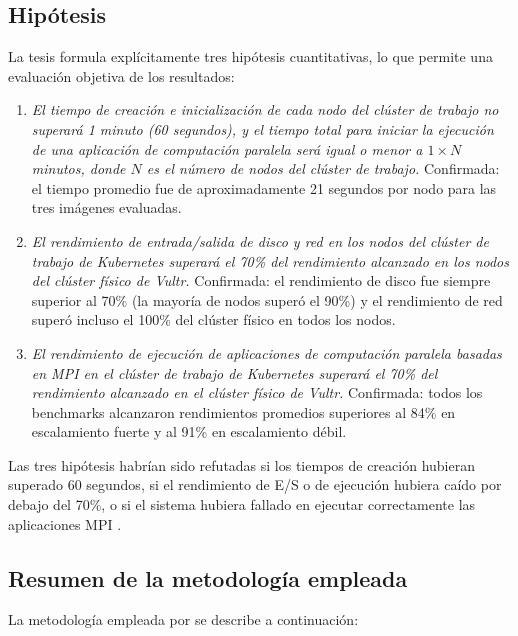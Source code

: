 \subsection{Hipótesis}

La tesis formula explícitamente tres hipótesis cuantitativas, lo que permite una evaluación objetiva de los resultados:

\begin{enumerate}
    \item \textit{El tiempo de creación e inicialización de cada nodo del clúster de trabajo no superará 1 minuto (60 segundos), y el tiempo total para iniciar la ejecución de una aplicación de computación paralela será igual o menor a $1 \times N$ minutos, donde $N$ es el número de nodos del clúster de trabajo.} Confirmada: el tiempo promedio fue de aproximadamente 21 segundos por nodo para las tres imágenes evaluadas.

    \item \textit{El rendimiento de entrada/salida de disco y red en los nodos del clúster de trabajo de Kubernetes superará el 70\% del rendimiento alcanzado en los nodos del clúster físico de Vultr.} Confirmada: el rendimiento de disco fue siempre superior al 70\% (la mayoría de nodos superó el 90\%) y el rendimiento de red superó incluso el 100\% del clúster físico en todos los nodos.

    \item \textit{El rendimiento de ejecución de aplicaciones de computación paralela basadas en MPI en el clúster de trabajo de Kubernetes superará el 70\% del rendimiento alcanzado en el clúster físico de Vultr.} Confirmada: todos los benchmarks alcanzaron rendimientos promedios superiores al 84\% en escalamiento fuerte y al 91\% en escalamiento débil.
\end{enumerate}

Las tres hipótesis habrían sido refutadas si los tiempos de creación hubieran superado 60 segundos, si el rendimiento de E/S o de ejecución hubiera caído por debajo del 70\%, o si el sistema hubiera fallado en ejecutar correctamente las aplicaciones MPI \cite{arias2024}.

\subsection{Resumen de la metodología empleada}

La metodología empleada por \cite{arias2024} se describe a continuación:

